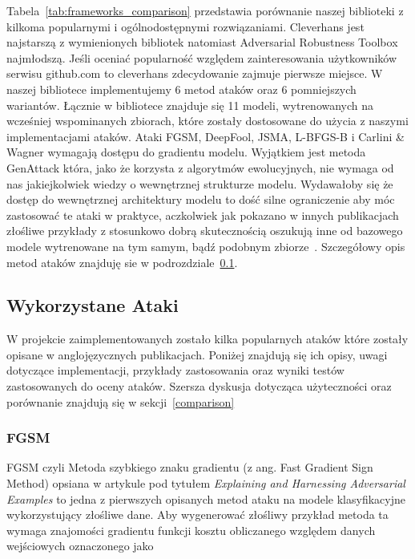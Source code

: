 \documentclass[
    left=2.5cm,         %
    right=2.5cm,        %
    top=2.5cm,          %
    bottom=3cm,         %
    bindingoffset=6mm,  %
    nohyphenation=false %
]{eiti/eiti-thesis}
\begin{document}
Tabela~\ref{tab:frameworks_comparison} przedstawia porównanie naszej biblioteki z kilkoma popularnymi i ogólnodostępnymi rozwiązaniami.
Cleverhans jest najstarszą z wymienionych bibliotek natomiast Adversarial Robustness Toolbox najmłodszą.
Jeśli oceniać popularność względem zainteresowania użytkowników serwisu github.com to cleverhans zdecydowanie zajmuje pierwsze miejsce.
W naszej bibliotece implementujemy 6 metod ataków oraz 6 pomniejszych wariantów. Łącznie w bibliotece znajduje się
11 modeli, wytrenowanych na wcześniej wspominanych zbiorach, które zostały dostosowane do użycia z naszymi implementacjami ataków.
Ataki FGSM, DeepFool, JSMA, L-BFGS-B i Carlini & Wagner wymagają dostępu do gradientu modelu.
Wyjątkiem jest metoda GenAttack która, jako że korzysta z algorytmów ewolucyjnych, nie wymaga od nas jakiejkolwiek wiedzy o wewnętrznej strukturze modelu.
Wydawałoby się że dostęp do wewnętrznej architektury modelu to dość silne ograniczenie aby móc zastosować te ataki w praktyce, aczkolwiek jak pokazano w innych publikacjach złośliwe przykłady z stosunkowo dobrą
skutecznością oszukują inne od bazowego modele wytrenowane na tym samym, bądź podobnym zbiorze~\cite{DBLP:journals/corr/PapernotMG16}.
Szczegółowy opis metod ataków znajduję sie w podrozdziale~\ref{sec:used_attacks}.


\subsection{Wykorzystane Ataki}\label{sec:used_attacks}
W projekcie zaimplementowanych zostało kilka popularnych ataków które zostały opisane w anglojęzycznych publikacjach.
Poniżej znajdują się ich opisy, uwagi dotyczące implementacji, przykłady zastosowania oraz wyniki testów
zastosowanych do oceny ataków. Szersza dyskusja dotycząca użyteczności oraz porównanie znajdują się w sekcji~\ref{comparison}

\subsubsection{FGSM}
    FGSM czyli Metoda szybkiego znaku gradientu (z ang. Fast Gradient Sign Method) opsiana w artykule
    pod tytułem \textit{Explaining and Harnessing Adversarial Examples}\cite{harnessing} to jedna z pierwszych
    opisanych metod ataku na modele klasyfikacyjne wykorzystujący złośliwe dane.
    Aby wygenerować złośliwy przykład metoda ta wymaga znajomości gradientu funkcji kosztu obliczanego względem danych
    wejściowych oznaczonego jako
\end{document}
